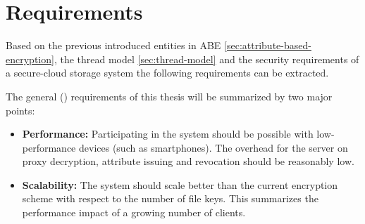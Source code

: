 \section{Requirements}
\label{sec:requirements}
Based on the previous introduced entities in ABE \ref{sec:attribute-based-encryption}, the thread model \ref{sec:thread-model} and the security requirements of a secure-cloud storage system the following requirements can be extracted.

The general () requirements of this thesis will be summarized by two major points: 

\begin{itemize}
	\item[\req{B1}] \textbf{Performance:} Participating in the system should be possible with low-performance devices (such as smartphones). The overhead for the server on proxy decryption, attribute issuing and revocation should be reasonably low.  
	\item[\req{B2}] \textbf{Scalability:} The system should scale better than the current encryption scheme with respect to the number of file keys. This summarizes the performance impact of a growing number of clients.
\end{itemize}


